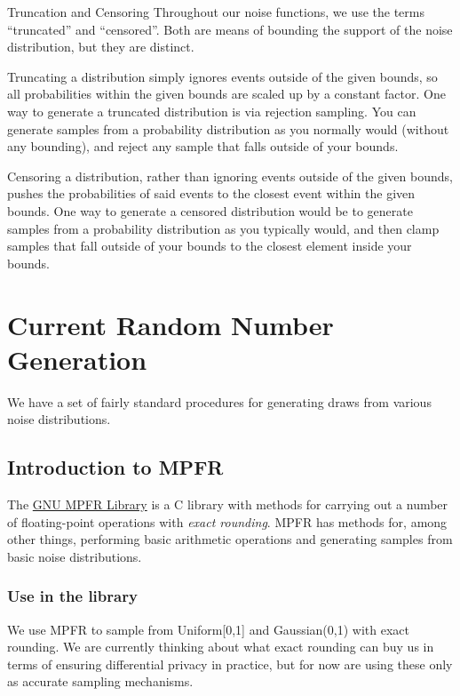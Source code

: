 \documentclass[11pt]{scrartcl} %
\begin{document}
\begin{definition}
	\label{def:truncation_censoring}
	Truncation and Censoring \newline
	Throughout our noise functions, we use the terms ``truncated'' and ``censored''.
	Both are means of bounding the support of the noise distribution, but they are distinct. \newline

	Truncating a distribution simply ignores events outside of the given bounds, so
	all probabilities within the given bounds are scaled up by a constant factor.
	One way to generate a truncated distribution is via rejection sampling.
	You can generate samples from a probability distribution as you normally would (without any bounding),
	and reject any sample that falls outside of your bounds. \newline

	Censoring a distribution, rather than ignoring events outside of the given bounds, pushes the
	probabilities of said events to the closest event within the given bounds. One way to generate
	a censored distribution would be to generate samples from a probability distribution as you
	typically would, and then clamp samples that fall outside of your bounds to the closest element
	inside your bounds.
\end{definition}

\section{Current Random Number Generation}
We have a set of fairly standard procedures for generating draws from various noise distributions.

\subsection{Introduction to MPFR}
The \href{https://www.mpfr.org/}{GNU MPFR Library}\cite{FHL+07} is a C library with methods for carrying out a number
of floating-point operations with \emph{exact rounding}.
MPFR has methods for, among other things, performing basic arithmetic operations and generating samples
from basic noise distributions. \newline 

\subsubsection{Use in the library}
We use MPFR to sample from Uniform[0,1] and Gaussian(0,1) with exact rounding. We are currently thinking about what exact rounding can buy us in terms 
of ensuring differential privacy in practice, but for now are using these only as accurate sampling mechanisms. \newline 
\end{document}
